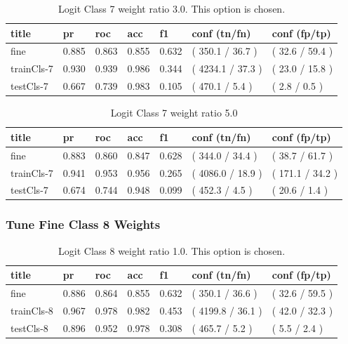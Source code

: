 \documentclass[ms]{nuthesis}
\begin{document}
\FloatBarrier
\begin{table}[H]
\centering
\caption{Logit Class 7 weight ratio 3.0. This option is chosen.}
\label{tab:LogRegCls7-Wt3}
\begin{tabular}{|l||l||l||l||l||l||l|}\toprule
title & pr & roc & acc & f1 & conf (tn/fn) & conf (fp/tp) \\ \midrule
fine & 0.885 & 0.863 & 0.855 & 0.632 & ( 350.1 / 36.7 ) & ( 32.6 / 59.4 ) \\
trainCls-7 & 0.930 & 0.939 & 0.986 & 0.344 & ( 4234.1 / 37.3 ) & ( 23.0 / 15.8 ) \\
testCls-7 & 0.667 & 0.739 & 0.983 & 0.105 & ( 470.1 / 5.4 ) & ( 2.8 / 0.5 ) \\ \bottomrule
\end{tabular}
\end{table}
\FloatBarrier

\FloatBarrier
\begin{table}[H]
\centering
\caption{Logit Class 7 weight ratio 5.0}
\label{tab:LogRegCls7-Wt5}
\begin{tabular}{|l||l||l||l||l||l||l|}\toprule
title & pr & roc & acc & f1 & conf (tn/fn) & conf (fp/tp) \\ \midrule
fine & 0.883 & 0.860 & 0.847 & 0.628 & ( 344.0 / 34.4 ) & ( 38.7 / 61.7 ) \\
trainCls-7 & 0.941 & 0.953 & 0.956 & 0.265 & ( 4086.0 / 18.9 ) & ( 171.1 / 34.2 ) \\
testCls-7 & 0.674 & 0.744 & 0.948 & 0.099 & ( 452.3 / 4.5 ) & ( 20.6 / 1.4 ) \\ \bottomrule
\end{tabular}
\end{table}
\FloatBarrier

\subsubsection{Tune Fine Class 8 Weights}
\FloatBarrier
\begin{table}[H]
\centering
\caption{Logit Class 8 weight ratio 1.0. This option is chosen.}
\label{tab:LogRegCls8-Wt1}
\begin{tabular}{|l||l||l||l||l||l||l|}\toprule
title & pr & roc & acc & f1 & conf (tn/fn) & conf (fp/tp) \\ \midrule
fine & 0.886 & 0.864 & 0.855 & 0.632 & ( 350.1 / 36.6 ) & ( 32.6 / 59.5 ) \\
trainCls-8 & 0.967 & 0.978 & 0.982 & 0.453 & ( 4199.8 / 36.1 ) & ( 42.0 / 32.3 ) \\
testCls-8 & 0.896 & 0.952 & 0.978 & 0.308 & ( 465.7 / 5.2 ) & ( 5.5 / 2.4 ) \\ \bottomrule
\end{tabular}
\end{table}
\FloatBarrier
\end{document}
